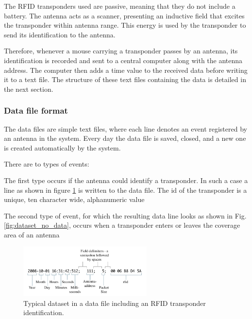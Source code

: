 The RFID transponders used are passive, meaning that they do not include a battery. The antenna acts as a scanner, presenting an inductive field that excites the transponder within antenna range. This energy is used by the transponder to send its identification to the antenna. 

Therefore, whenever a mouse carrying a transponder passes by an antenna, its identification is recorded and sent to a central computer along with the antenna address. The computer then adds a time value to the received data before writing it to a text file. The structure of these text files containing the data is detailed in the next section.

\subsubsection{Data file format}
\label{subsubsec:datafileformat}
The data files are simple text files, where each line denotes an event registered by an antenna in the system. Every day the data file is saved, closed, and a new one is created automatically by the system.

There are to types of events: %
\begin{mylist}
 \item The first type occurs if the antenna could identify a transponder. In such a case a line as shown in figure \ref{fig:dataset} is written to the data file. The id of the transponder is a unique, ten character wide, alphanumeric value
 \item The second type of event, for which the resulting data line looks as shown in Fig. \ref{fig:dataset_no_data}, occurs when a transponder enters or leaves the coverage area of an antenna
 \item 
\end{mylist}

\begin{figure}[!htbp]	
\centering	
\includegraphics[width=0.6\textwidth]{assets/pdf/dataset.pdf}	
\caption[Dataset including an RFID transponder identification]{Typical dataset in a data file including an RFID transponder identification.}
\label{fig:dataset}
\end{figure}

